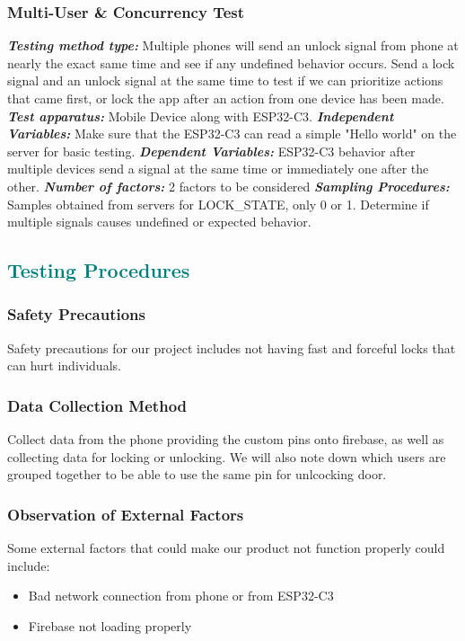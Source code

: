 \documentclass[a4paper,12pt]{article}
\begin{document}
\subsubsection{Multi-User \& Concurrency Test}
\textbf{\textit{Testing method type:}} Multiple phones will send an unlock signal from phone at nearly the exact same time and see if any undefined behavior occurs. Send a lock signal and an unlock signal at the same time to test if we can prioritize actions that came first, or lock the app after an action from one device has been made.
\newline
\textbf{\textit{Test apparatus:}} Mobile Device along with ESP32-C3.
\newline
\textbf{\textit{Independent Variables:}} Make sure that the ESP32-C3 can read a simple "Hello world" on the server for basic testing.
\newline
\textbf{\textit{Dependent Variables:}} ESP32-C3 behavior after multiple devices send a signal at the same time or immediately one after the other.
\newline
\textbf{\textit{Number of factors:}} 2 factors to be considered
\newline
\textbf{\textit{Sampling Procedures:}} Samples obtained from servers for LOCK\_STATE, only 0 or 1. Determine if multiple signals causes undefined or expected behavior.



\textcolor{teal}{\subsection*{Testing Procedures}}
\subsubsection{Safety Precautions}
Safety precautions for our project includes not having fast and forceful locks that can hurt individuals.

\subsubsection{Data Collection Method}
Collect data from the phone providing the custom pins onto firebase, as well as collecting data for locking or unlocking. We will also note down which users are grouped together to be able to use the same pin for unlcocking door.

\subsubsection{Observation of External Factors}
Some external factors that could make our product not function properly could include:

\begin{itemize}
    \item Bad network connection from phone or from ESP32-C3
    \item Firebase not loading properly
\end{itemize}


\end{document}
